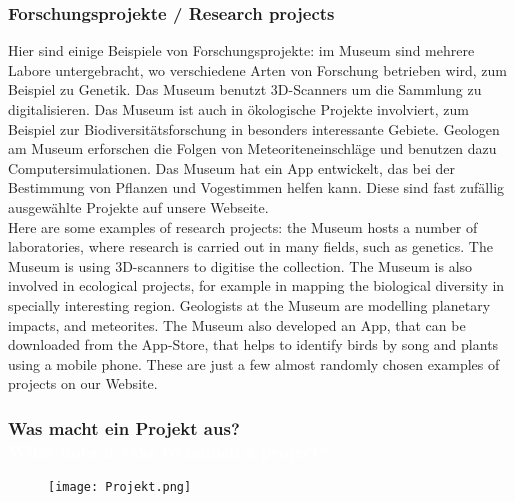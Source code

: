 {\scriptsize
\begin{frame}
  \frametitle{Forschungsprojekte / \textcolor{mfn_green}{Research projects}}
  Hier sind einige Beispiele von Forschungsprojekte: im Museum sind mehrere Labore untergebracht, wo verschiedene Arten von Forschung betrieben wird, zum Beispiel zu Genetik. Das Museum benutzt 3D-Scanners um die Sammlung zu digitalisieren. Das Museum ist auch in ökologische Projekte involviert, zum Beispiel zur Biodiversitätsforschung in besonders interessante Gebiete. Geologen am Museum erforschen die Folgen von Meteoriteneinschläge und benutzen dazu Computersimulationen. Das Museum hat ein App entwickelt, das bei der Bestimmung von Pflanzen und Vogestimmen helfen kann. Diese sind fast zufällig ausgewählte Projekte auf unsere Webseite.\\
  \bigskip
  \textcolor{mfn_green}{Here are some examples of research projects: the Museum hosts a number of laboratories, where research is carried out in many fields, such as genetics. The Museum is using 3D-scanners to digitise the collection. The Museum is also involved in ecological projects, for example in mapping the biological diversity in specially interesting region. Geologists at the Museum are modelling planetary impacts, and meteorites. The Museum also developed an App, that can be downloaded from the App-Store, that helps to identify birds by song and plants using a mobile phone. These are just a few almost randomly chosen examples of projects on our Website.}
\end{frame}
}
{
\begin{frame}
  \frametitle{Was macht ein Projekt aus? \\ \textcolor{white}{What does it take to launch a project?}}
  \begin{figure}
  \texttt{[image: Projekt.png]}
  \end{figure}
  \bigskip
\end{frame}
}

